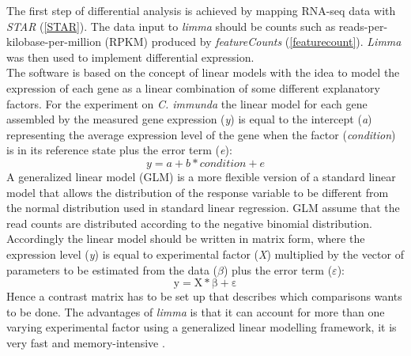 \documentclass[12pt, a4paper]{report}
\begin{document}
The first step of differential analysis is achieved by mapping RNA-seq data with \textit{STAR} (\ref{STAR}). The data input to \textit{limma} should be counts such as reads-per-kilobase-per-million (RPKM) produced by \textit{featureCounts} (\ref{featurecount}). \textit{Limma} was then used to implement differential expression. \\
The software is based on the concept of linear models with the idea to model the expression of each gene as a linear combination of some different explanatory factors. For the experiment on \textit{C. immunda} the linear model for each gene assembled by the measured gene expression (\textit{y}) is equal to the intercept (\textit{a}) representing the average expression level of the gene when the factor (\textit{condition}) is in its reference state plus the error term (\textit{e}): 
\[y = a + b * condition + e\]
A generalized linear model (GLM) is a more flexible version of a standard linear model that allows the distribution of the response variable to be different from the normal distribution used in standard linear regression. GLM assume that the read counts are distributed according to the negative binomial distribution. 
Accordingly the linear model should be written in matrix form, where the expression level (\textit{y}) is equal to experimental factor (\textit{X}) multiplied by the vector of parameters to be estimated from the data ($\beta$) plus the error term ($\varepsilon$):
\[ \mathrm{ y = X * \beta + \varepsilon}\]
Hence a contrast matrix has to be set up that describes which comparisons wants to be done. The advantages of \textit{limma} is that it can account for more than one varying experimental factor using a generalized linear modelling framework, it is very fast and memory-intensive \cite{Ritchie2015}. 
\end{document}
